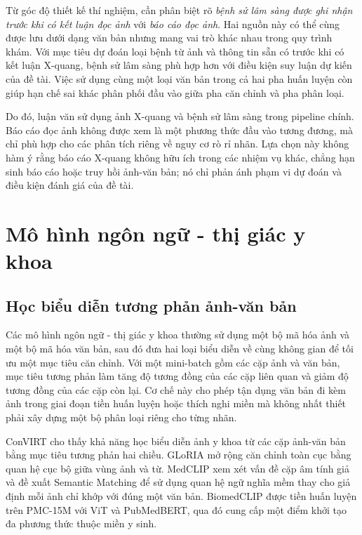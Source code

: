 Từ góc độ thiết kế thí nghiệm, cần phân biệt rõ \textit{bệnh sử lâm sàng được ghi nhận trước khi có kết luận đọc ảnh} với \textit{báo cáo đọc ảnh}. Hai nguồn này có thể cùng được lưu dưới dạng văn bản nhưng mang vai trò khác nhau trong quy trình khám. Với mục tiêu dự đoán loại bệnh từ ảnh và thông tin sẵn có trước khi có kết luận X-quang, bệnh sử lâm sàng phù hợp hơn với điều kiện suy luận dự kiến của đề tài. Việc sử dụng cùng một loại văn bản trong cả hai pha huấn luyện còn giúp hạn chế sai khác phân phối đầu vào giữa pha căn chỉnh và pha phân loại.

Do đó, luận văn sử dụng ảnh X-quang và bệnh sử lâm sàng trong pipeline chính. Báo cáo đọc ảnh không được xem là một phương thức đầu vào tương đương, mà chỉ phù hợp cho các phân tích riêng về nguy cơ rò rỉ nhãn. Lựa chọn này không hàm ý rằng báo cáo X-quang không hữu ích trong các nhiệm vụ khác, chẳng hạn sinh báo cáo hoặc truy hồi ảnh-văn bản; nó chỉ phản ánh phạm vi dự đoán và điều kiện đánh giá của đề tài.

\section{Mô hình ngôn ngữ - thị giác y khoa}

\subsection{Học biểu diễn tương phản ảnh-văn bản}

Các mô hình ngôn ngữ - thị giác y khoa thường sử dụng một bộ mã hóa ảnh và một bộ mã hóa văn bản, sau đó đưa hai loại biểu diễn về cùng không gian để tối ưu một mục tiêu căn chỉnh. Với một mini-batch gồm các cặp ảnh và văn bản, mục tiêu tương phản làm tăng độ tương đồng của các cặp liên quan và giảm độ tương đồng của các cặp còn lại. Cơ chế này cho phép tận dụng văn bản đi kèm ảnh trong giai đoạn tiền huấn luyện hoặc thích nghi miền mà không nhất thiết phải xây dựng một bộ phân loại riêng cho từng nhãn.

ConVIRT \cite{ConVIRT} cho thấy khả năng học biểu diễn ảnh y khoa từ các cặp ảnh-văn bản bằng mục tiêu tương phản hai chiều. GLoRIA \cite{GLoRIA} mở rộng căn chỉnh toàn cục bằng quan hệ cục bộ giữa vùng ảnh và từ. MedCLIP \cite{MedCLIP} xem xét vấn đề cặp âm tính giả và đề xuất Semantic Matching để sử dụng quan hệ ngữ nghĩa mềm thay cho giả định mỗi ảnh chỉ khớp với đúng một văn bản. BiomedCLIP \cite{BiomedCLIP} được tiền huấn luyện trên PMC-15M với ViT và PubMedBERT, qua đó cung cấp một điểm khởi tạo đa phương thức thuộc miền y sinh.


